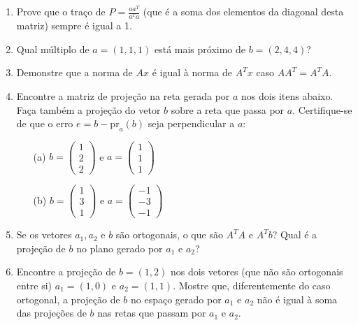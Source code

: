 \documentclass[12pt]{article}
\begin{document}
\begin{enumerate}
   \item Prove que o traço de $P = \frac{aa^T}{a^Ta}$ (que é a soma dos elementos da diagonal desta matriz) sempre é igual a 1.
   \item Qual múltiplo de $a=(1,1,1)$ está mais próximo de $b=(2,4,4)$?
   \item Demonstre que a norma de $Ax$ é igual à norma de $A^Tx$ caso $AA^T=A^TA$.
   \item Encontre a matriz de projeção na reta gerada por $a$ nos dois itens abaixo. Faça também a projeção do vetor $b$ sobre a reta que passa por $a$. Certifique-se de que o erro $e = b-\mbox{pr}_{a}(b)$ seja perpendicular a $a$:
   \begin{itemize}
      \item[(a)] $b =
      \begin{pmatrix}
         1\\2\\2
      \end{pmatrix}
      $ e $a=
      \begin{pmatrix}
         1\\1\\1
      \end{pmatrix}$
      \item[(b)] $b=
      \begin{pmatrix}
         1\\3\\1
      \end{pmatrix}
      $ e $a =
      \begin{pmatrix}
         -1\\-3\\-1
      \end{pmatrix}
      $
   \end{itemize}
   \item Se os vetores $a_1, a_2$ e $b$ são ortogonais, o que são $A^TA$ e $A^Tb$? Qual é a projeção de $b$ no plano gerado por $a_1$ e $a_2$?

   \item Encontre a projeção de $b=(1,2)$ nos dois vetores (que não são ortogonais entre si) $a_1 = (1,0)$ e $a_2 = (1,1)$. Mostre que, diferentemente do caso ortogonal, a projeção de $b$ no espaço gerado por $a_1$ e $a_2$ não é igual à soma das projeções de $b$ nas retas que passam por $a_1$ e $a_2$.


\end{enumerate}
\end{document}
